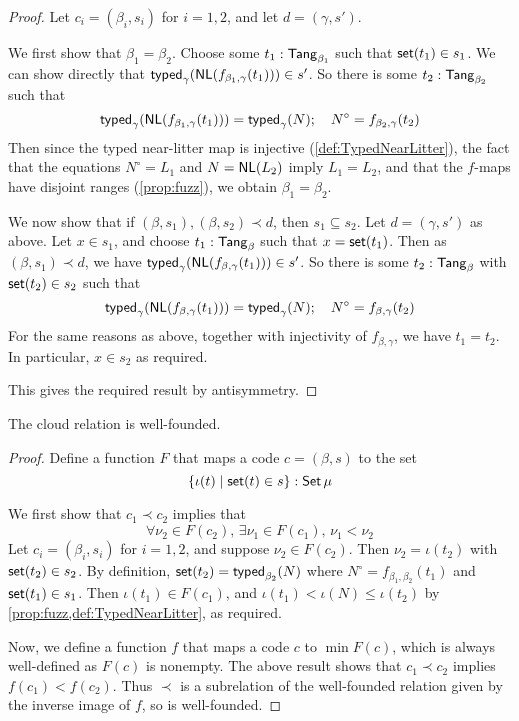 \begin{proof}
  Let \( c_i = (\beta_i, s_i) \) for \( i = 1, 2 \), and let \( d = (\gamma, s') \).

  We first show that \( \beta_1 = \beta_2 \).
  Choose some \( t_1 : \mathsf{Tang}_{\beta_1} \) such that \( \operatorname{\mathsf{set}}(t_1) \in s_1 \).
  We can show directly that \( \operatorname{\mathsf{typed}}_\gamma(\operatorname{\mathsf{NL}}(f_{\beta_1,\gamma}(t_1))) \in s' \).
  So there is some \( t_2 : \mathsf{Tang}_{\beta_2} \) such that
  \[ \operatorname{\mathsf{typed}}_\gamma(\operatorname{\mathsf{NL}}(f_{\beta_1,\gamma}(t_1))) = \operatorname{\mathsf{typed}}_\gamma(N);\quad N^\circ = f_{\beta_2,\gamma}(t_2) \]
  Then since the typed near-litter map is injective (\cref{def:TypedNearLitter}), the fact that the equations \( N^\circ = L_1 \) and \( N = \operatorname{\mathsf{NL}}(L_2) \) imply \( L_1 = L_2 \), and that the \( f \)-maps have disjoint ranges (\cref{prop:fuzz}), we obtain \( \beta_1 = \beta_2 \).

  We now show that if \( (\beta, s_1), (\beta, s_2) \prec d \), then \( s_1 \subseteq s_2 \).
  Let \( d = (\gamma, s') \) as above.
  Let \( x \in s_1 \), and choose \( t_1 : \mathsf{Tang}_\beta \) such that \( x = \operatorname{\mathsf{set}}(t_1) \).
  Then as \( (\beta, s_1) \prec d \), we have \( \operatorname{\mathsf{typed}}_\gamma(\operatorname{\mathsf{NL}}(f_{\beta,\gamma}(t_1))) \in s' \).
  So there is some \( t_2 : \mathsf{Tang}_\beta \) with \( \operatorname{\mathsf{set}}(t_2) \in s_2 \) such that
  \[ \operatorname{\mathsf{typed}}_\gamma(\operatorname{\mathsf{NL}}(f_{\beta,\gamma}(t_1))) = \operatorname{\mathsf{typed}}_\gamma(N);\quad N^\circ = f_{\beta,\gamma}(t_2) \]
  For the same reasons as above, together with injectivity of \( f_{\beta,\gamma} \), we have \( t_1 = t_2 \).
  In particular, \( x \in s_2 \) as required.

  This gives the required result by antisymmetry.
\end{proof}
\begin{proposition}
  \label{prop:cloud_wf}
  The cloud relation is well-founded.
\end{proposition}
\begin{proof}
  Define a function \( F \) that maps a code \( c = (\beta, s) \) to the set
  \[ \{ \iota(t) \mid \operatorname{\mathsf{set}}(t) \in s \} : \operatorname{\mathsf{Set}} \mu \]

  We first show that \( c_1 \prec c_2 \) implies that
  \[ \forall \nu_2 \in F(c_2),\, \exists \nu_1 \in F(c_1),\, \nu_1 < \nu_2 \]
  Let \( c_i = (\beta_i, s_i) \) for \( i = 1, 2 \), and suppose \( \nu_2 \in F(c_2) \).
  Then \( \nu_2 = \iota(t_2) \) with \( \operatorname{\mathsf{set}}(t_2) \in s_2 \).
  By definition, \( \operatorname{\mathsf{set}}(t_2) = \operatorname{\mathsf{typed}}_{\beta_2}(N) \) where \( N^\circ = f_{\beta_1,\beta_2}(t_1) \) and \( \operatorname{\mathsf{set}}(t_1) \in s_1 \).
  Then \( \iota(t_1) \in F(c_1) \), and \( \iota(t_1) < \iota(N) \leq \iota(t_2) \) by \cref{prop:fuzz,def:TypedNearLitter}, as required.

  Now, we define a function \( f \) that maps a code \( c \) to \( \min F(c) \), which is always well-defined as \( F(c) \) is nonempty.
  The above result shows that \( c_1 \prec c_2 \) implies \( f(c_1) < f(c_2) \).
  Thus \( \prec \) is a subrelation of the well-founded relation given by the inverse image of \( f \), so is well-founded.
\end{proof}
